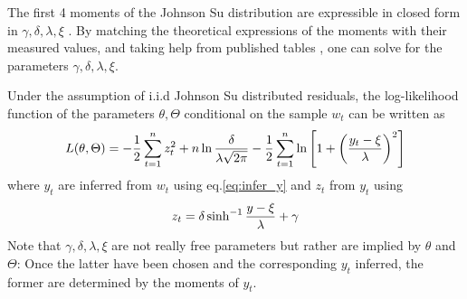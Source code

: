 The first 4 moments of the Johnson Su distribution are expressible
in closed form in $\gamma, \delta, \lambda, \xi$ \cite{Shang2004}.
By matching the theoretical expressions of the moments with their
measured values, and taking help from published tables
\cite{Johnson1965}, one can solve for the parameters $\gamma, \delta,
\lambda, \xi$.

Under the assumption of i.i.d Johnson Su distributed residuals, the
log-likelihood function of the parameters $\theta, \Theta$
conditional on the sample $w_t$ can be written as
\[
L(\theta, \Theta) = -{1 \over 2}\sum_{t=1}^n z_t^2 + n \ln{\delta
  \over \lambda \sqrt{2\pi}} - {1 \over 2}\sum_{t=1}^n \ln\left[
  1 + \left({y_t - \xi \over \lambda}\right)^2
\right]
\]
where $y_t$ are inferred from $w_t$ using eq.\ref{eq:infer_y}
and $z_t$ from $y_t$ using
\[
z_t = \delta \sinh^{-1}{y - \xi \over \lambda} + \gamma
\]
Note that $\gamma, \delta, \lambda, \xi$ are not really free
parameters but rather are implied by $\theta$ and $\Theta$: Once the
latter have been chosen and the corresponding $y_t$ inferred, the
former are determined by the moments of $y_t$.


